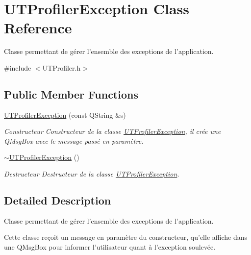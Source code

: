 \hypertarget{class_u_t_profiler_exception}{\section{U\-T\-Profiler\-Exception Class Reference}
\label{class_u_t_profiler_exception}
}


Classe permettant de gérer l'ensemble des exceptions de l'application.  




{\ttfamily \#include $<$U\-T\-Profiler.\-h$>$}

\subsection*{Public Member Functions}
\begin{DoxyCompactItemize}
\item 
\hyperlink{class_u_t_profiler_exception_aa8b3ca107d8de47ad4da8baa1e5a76d6}{U\-T\-Profiler\-Exception} (const Q\-String \&s)
\begin{DoxyCompactList}\small\item\em Constructeur Constructeur de la classe \hyperlink{class_u_t_profiler_exception}{U\-T\-Profiler\-Exception}, il crée une Q\-Msg\-Box avec le message passé en paramètre. \end{DoxyCompactList}\item 
\hypertarget{class_u_t_profiler_exception_ac43abbb72e3967b5c34f78838ae04de4}{\hyperlink{class_u_t_profiler_exception_ac43abbb72e3967b5c34f78838ae04de4}{$\sim$\-U\-T\-Profiler\-Exception} ()}\label{class_u_t_profiler_exception_ac43abbb72e3967b5c34f78838ae04de4}

\begin{DoxyCompactList}\small\item\em Destructeur Destructeur de la classe \hyperlink{class_u_t_profiler_exception}{U\-T\-Profiler\-Exception}. \end{DoxyCompactList}\end{DoxyCompactItemize}


\subsection{Detailed Description}
Classe permettant de gérer l'ensemble des exceptions de l'application. 

Cette classe reçoit un message en paramètre du constructeur, qu'elle affiche dans une Q\-Msg\-Box pour informer l'utilisateur quant à l'exception soulevée. 

